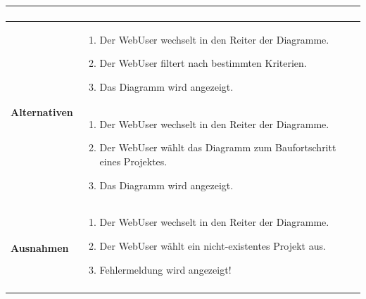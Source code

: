 \begin{longtable}[c]{|p{4cm}|p{10cm}|}
\begin{enumerate}
    \end{enumerate}                                                                                                                               \\ \hline
    \multirow{2}{*}{\textbf{Alternativen}} &
    \begin{enumerate}
        \item Der WebUser wechselt in den Reiter der Diagramme.
        \item Der WebUser filtert nach bestimmten Kriterien.
        \item Das Diagramm wird angezeigt.
    \end{enumerate}                                                                                                                               \\\cline{2-2} &
    \begin{enumerate}
        \item Der WebUser wechselt in den Reiter der Diagramme.
        \item Der WebUser wählt das Diagramm zum Baufortschritt eines Projektes.
        \item Das Diagramm wird angezeigt.
    \end{enumerate}                                                                                                                               \\ \hline
    \multirow{2}{*}{\textbf{Ausnahmen}}    &
    \begin{enumerate} %
        \item Der WebUser wechselt in den Reiter der Diagramme.
        \item Der WebUser wählt ein nicht-existentes Projekt aus.
        \item Fehlermeldung wird angezeigt!
    \end{enumerate}                                                                                                                               \\\cline{2-2} &

\end{longtable}
